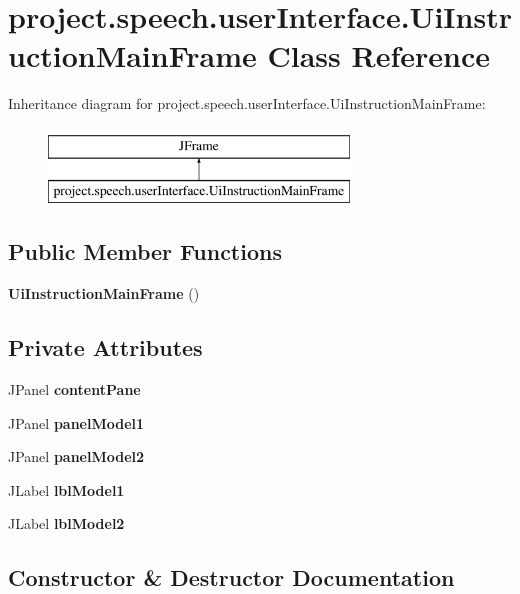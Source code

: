 \section{project.\+speech.\+user\+Interface.\+Ui\+Instruction\+Main\+Frame Class Reference}
\label{classproject_1_1speech_1_1user_interface_1_1_ui_instruction_main_frame}
Inheritance diagram for project.\+speech.\+user\+Interface.\+Ui\+Instruction\+Main\+Frame\+:\begin{figure}[H]
\begin{center}
\leavevmode
\includegraphics[height=2.000000cm]{classproject_1_1speech_1_1user_interface_1_1_ui_instruction_main_frame}
\end{center}
\end{figure}
\subsection*{Public Member Functions}
\begin{DoxyCompactItemize}
\item 
{\bf Ui\+Instruction\+Main\+Frame} ()
\end{DoxyCompactItemize}
\subsection*{Private Attributes}
\begin{DoxyCompactItemize}
\item 
J\+Panel {\bf content\+Pane}
\item 
J\+Panel {\bf panel\+Model1}
\item 
J\+Panel {\bf panel\+Model2}
\item 
J\+Label {\bf lbl\+Model1}
\item 
J\+Label {\bf lbl\+Model2}
\end{DoxyCompactItemize}


\subsection{Constructor \& Destructor Documentation}
